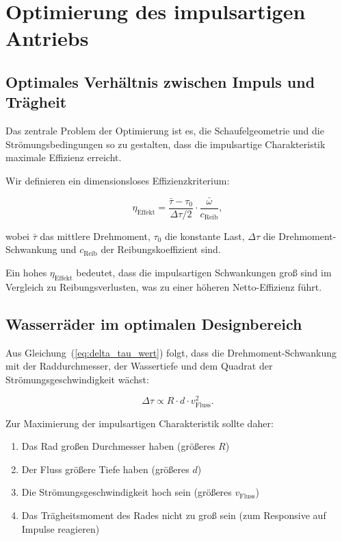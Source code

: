 \documentclass[a4paper,12pt]{article}
\theoremstyle{definition}
\begin{document}
\section{Optimierung des impulsartigen Antriebs}

\subsection{Optimales Verhältnis zwischen Impuls und Trägheit}

Das zentrale Problem der Optimierung ist es, die Schaufelgeometrie und die Strömungsbedingungen so zu gestalten, dass die impulsartige Charakteristik maximale Effizienz erreicht.

Wir definieren ein dimensionsloses Effizienzkriterium:

\begin{equation}
  \eta_\text{Effekt} = \frac{\bar{\tau} - \tau_0}{\Delta \tau / 2} \cdot \frac{\bar{\omega}}{c_\text{Reib}},
  \label{eq:effizienz_kriterium}
\end{equation}

\noindent
wobei $\bar{\tau}$ das mittlere Drehmoment, $\tau_0$ die konstante Last, $\Delta\tau$ die Drehmoment-Schwankung und $c_\text{Reib}$ der Reibungskoeffizient sind.

Ein hohes $\eta_\text{Effekt}$ bedeutet, dass die impulsartigen Schwankungen groß sind im Vergleich zu Reibungsverlusten, was zu einer höheren Netto-Effizienz führt.

\subsection{Wasserräder im optimalen Designbereich}

Aus Gleichung~(\ref{eq:delta_tau_wert}) folgt, dass die Drehmoment-Schwankung mit der Raddurchmesser, der Wassertiefe und dem Quadrat der Strömungsgeschwindigkeit wächst:

\begin{equation}
  \Delta \tau \propto R \cdot d \cdot v_\text{Fluss}^2.
  \label{eq:delta_tau_skalierung}
\end{equation}

Zur Maximierung der impulsartigen Charakteristik sollte daher:

\begin{enumerate}
  \item Das Rad großen Durchmesser haben (größeres $R$)
  \item Der Fluss größere Tiefe haben (größeres $d$)
  \item Die Strömungsgeschwindigkeit hoch sein (größeres $v_\text{Fluss}$)
  \item Das Trägheitsmoment des Rades nicht zu groß sein (zum Responsive auf Impulse reagieren)
\end{enumerate}
\end{document}
